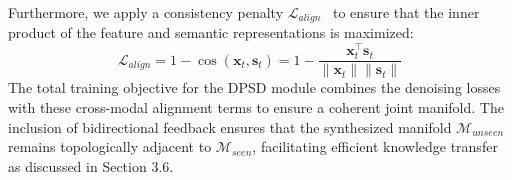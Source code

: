 Furthermore, we apply a consistency penalty $\mathcal{L}_{align}$~\cite{zbontar2021barlow} to ensure that the inner product of the feature and semantic representations is maximized:
\begin{equation}
\mathcal{L}_{align} = 1 - \cos(\mathbf{x}_t, \mathbf{s}_t) = 1 - \frac{\mathbf{x}_t^\top \mathbf{s}_t}{\|\mathbf{x}_t\| \|\mathbf{s}_t\|}
\end{equation}
The total training objective for the DPSD module combines the denoising losses with these cross-modal alignment terms to ensure a coherent joint manifold. The inclusion of bidirectional feedback ensures that the synthesized manifold $\mathcal{M}_{unseen}$ remains topologically adjacent to $\mathcal{M}_{seen}$, facilitating efficient knowledge transfer as discussed in Section 3.6.
